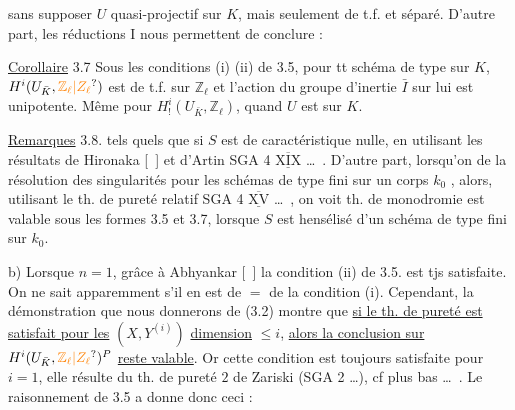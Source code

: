 sans supposer $U$ quasi-projectif sur $K$, mais seulement de t.f. et séparé. D'autre part, les réductions   I nous permettent de conclure :

\uline{Corollaire} 3.7 Sous les conditions (i) (ii) de 3.5, pour tt schéma  de type  sur $K$, $H^i(U_{\bar K},\unsure{\mathbb Z_\ell|Z_\ell})$ est de t.f. sur $\mathbb Z_\ell$ et l'action du groupe d'inertie $\bar I$ sur  lui est  unipotente. Même  pour $H^i_!(U_{\bar K},\mathbb Z_\ell)$, quand $U$ est   sur $K$.

\uline{Remarques} 3.8.    tels quels que si $S$ est de caractéristique nulle,  en utilisant les résultats de Hironaka [\ ] et d'Artin SGA 4 $\overline{\underline{\mathrm{XIX}}}$ \ldots\ . D'autre part,  lorsqu'on  de la résolution des singularités  pour les schémas de type fini sur un corps $k_0$ , alors, utilisant le th. de pureté relatif SGA 4 $\overline{\underline{\mathrm{XV}}}$ \ldots\ , on voit   th. de monodromie est valable   sous les formes 3.5 et 3.7, lorsque $S$ est  hensélisé  d'un schéma de type fini sur  $k_0$.

 b) Lorsque $n=1$,  grâce à Abhyankar [\ ] la condition (ii) de 3.5. est tjs satisfaite. On ne sait apparemment s'il en est de $=$ de la
condition (i). Cependant, la démonstration que nous donnerons  de (3.2) montre que \uline{si le th. de pureté est satisfait pour les} $(X,Y^{(i)})$ \uline{ dimension} $\leq i$, \uline{alors la conclusion sur} $H^i(U_{\bar K},\unsure{\mathbb Z_\ell|Z_\ell})^P$ \uline{reste valable}. Or  cette condition est toujours satisfaite pour $i=1$,  elle résulte du th. de pureté  $2$ de Zariski (SGA 2 \ldots),  cf plus bas \ldots\ . Le raisonnement de 3.5 a donne donc  ceci :

